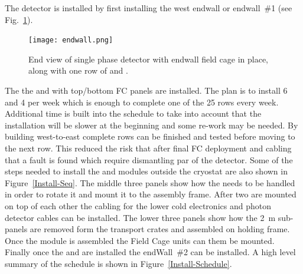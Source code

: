 The  detector is installed by first installing the west endwall or
endwall~\#1 (see Fig.~\ref{fig:endwall}).
\begin{figure}[htbp]
\begin{center}
\texttt{[image: endwall.png]}
\caption{End view of single phase detector with endwall field cage in
  place, along with one row of  and .}
\label{fig:endwall}
\end{center}
\end{figure}
The the  and  with top/bottom FC panels are
installed. The plan is to install \num{6}  and \num{4}
 per week which is enough to complete one of the \num{25}
rows every week. Additional time is built into the schedule to take
into account that the installation will be slower at the beginning and
some re-work may be needed. By building west-to-east complete rows can
be finished and tested before moving to the next row. This reduced the
risk that after final FC deployment and cabling that a fault is found
which require dismantling par of the detector. Some of the steps
needed to install the  and  modules outside the
cryostat are also shown in Figure~\ref{Install-Seq}.  The middle three
panels show how the  needs to be handled in order to rotate
it and mount it to the assembly frame. After two  are
mounted on top of each other the cabling for the lower 
cold electronics and photon detector cables can be installed. The
lower three panels show how the \SI{2}{m}  sub-panels are
removed form the transport crates and assembled on holding frame. Once
the  module is assembled the Field Cage units can them be
mounted. Finally once the  and  are installed
the endWall~\#2 can be installed. A high level summary of the schedule
is shown in Figure~\ref{Install-Schedule}.

